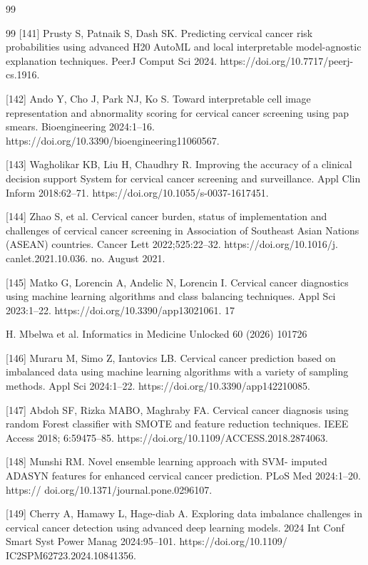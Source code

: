 \documentclass{svjour3}
\begin{document}
\begin{thebibliography}{99}
\begin{thebibliography}{99}
[141] Prusty S, Patnaik S, Dash SK. Predicting cervical cancer risk probabilities using advanced H20 AutoML and local interpretable model-agnostic explanation techniques. PeerJ Comput Sci 2024. https://doi.org/10.7717/peerj-cs.1916.

[142] Ando Y, Cho J, Park NJ, Ko S. Toward interpretable cell image representation and abnormality scoring for cervical cancer screening using pap smears. Bioengineering 2024:1–16. https://doi.org/10.3390/bioengineering11060567.

[143] Wagholikar KB, Liu H, Chaudhry R. Improving the accuracy of a clinical decision support System for cervical cancer screening and surveillance. Appl Clin Inform 2018:62–71. https://doi.org/10.1055/s-0037-1617451.

[144] Zhao S, et al. Cervical cancer burden, status of implementation and challenges of cervical cancer screening in Association of Southeast Asian Nations (ASEAN) countries. Cancer Lett 2022;525:22–32. https://doi.org/10.1016/j. canlet.2021.10.036. no. August 2021.

[145] Matko G, Lorencin A, Andelic N, Lorencin I. Cervical cancer diagnostics using machine learning algorithms and class balancing techniques. Appl Sci 2023:1–22. https://doi.org/10.3390/app13021061. 17

H. Mbelwa et al. Informatics in Medicine Unlocked 60 (2026) 101726

[146] Muraru M, Simo Z, Iantovics LB. Cervical cancer prediction based on imbalanced data using machine learning algorithms with a variety of sampling methods. Appl Sci 2024:1–22. https://doi.org/10.3390/app142210085.

[147] Abdoh SF, Rizka MABO, Maghraby FA. Cervical cancer diagnosis using random Forest classifier with SMOTE and feature reduction techniques. IEEE Access 2018; 6:59475–85. https://doi.org/10.1109/ACCESS.2018.2874063.

[148] Munshi RM. Novel ensemble learning approach with SVM- imputed ADASYN features for enhanced cervical cancer prediction. PLoS Med 2024:1–20. https:// doi.org/10.1371/journal.pone.0296107.

 [149] Cherry A, Hamawy L, Hage-diab A. Exploring data imbalance challenges in cervical cancer detection using advanced deep learning models. 2024 Int Conf Smart Syst Power Manag 2024:95–101. https://doi.org/10.1109/ IC2SPM62723.2024.10841356.


\end{thebibliography}
\end{thebibliography}
\end{document}
